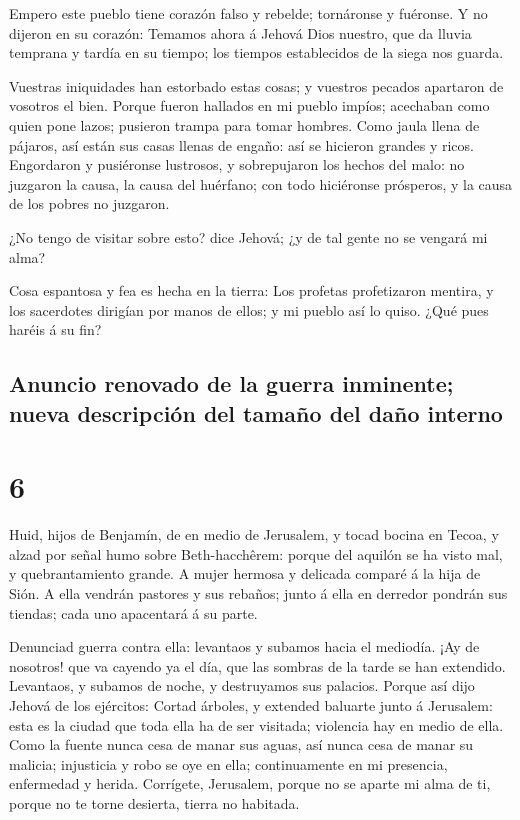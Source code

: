  Empero este pueblo tiene corazón falso y rebelde;
tornáronse y fuéronse.  Y no dijeron en su corazón:
Temamos ahora á Jehová Dios nuestro, que da lluvia temprana y tardía en
su tiempo; los tiempos establecidos de la siega nos guarda.

 Vuestras iniquidades han estorbado estas cosas; y
vuestros pecados apartaron de vosotros el bien.  Porque
fueron hallados en mi pueblo impíos; acechaban como quien pone lazos;
pusieron trampa para tomar hombres.  Como jaula llena de
pájaros, así están sus casas llenas de engaño: así se hicieron grandes y
ricos.  Engordaron y pusiéronse lustrosos, y sobrepujaron
los hechos del malo: no juzgaron la causa, la causa del huérfano; con
todo hiciéronse prósperos, y la causa de los pobres no juzgaron.

 ¿No tengo de visitar sobre esto? dice Jehová; ¿y de tal
gente no se vengará mi alma?

 Cosa espantosa y fea es hecha en la tierra:
 Los profetas profetizaron mentira, y los sacerdotes
dirigían por manos de ellos; y mi pueblo así lo quiso. ¿Qué pues haréis
á su fin?

\hypertarget{anuncio-renovado-de-la-guerra-inminente-nueva-descripciuxf3n-del-tamauxf1o-del-dauxf1o-interno}{%
\subsection{Anuncio renovado de la guerra inminente; nueva descripción
del tamaño del daño
interno}\label{anuncio-renovado-de-la-guerra-inminente-nueva-descripciuxf3n-del-tamauxf1o-del-dauxf1o-interno}}

\hypertarget{section-5}{%
\section{6}\label{section-5}}

 Huid, hijos de Benjamín, de en medio de Jerusalem, y
tocad bocina en Tecoa, y alzad por señal humo sobre Beth-hacchêrem:
porque del aquilón se ha visto mal, y quebrantamiento grande.
 A mujer hermosa y delicada comparé á la hija de Sión.
 A ella vendrán pastores y sus rebaños; junto á ella en
derredor pondrán sus tiendas; cada uno apacentará á su parte.

 Denunciad guerra contra ella: levantaos y subamos hacia
el mediodía. ¡Ay de nosotros! que va cayendo ya el día, que las sombras
de la tarde se han extendido.  Levantaos, y subamos de
noche, y destruyamos sus palacios.  Porque así dijo Jehová
de los ejércitos: Cortad árboles, y extended baluarte junto á Jerusalem:
esta es la ciudad que toda ella ha de ser visitada; violencia hay en
medio de ella.  Como la fuente nunca cesa de manar sus
aguas, así nunca cesa de manar su malicia; injusticia y robo se oye en
ella; continuamente en mi presencia, enfermedad y herida. 
Corrígete, Jerusalem, porque no se aparte mi alma de ti, porque no te
torne desierta, tierra no habitada.

